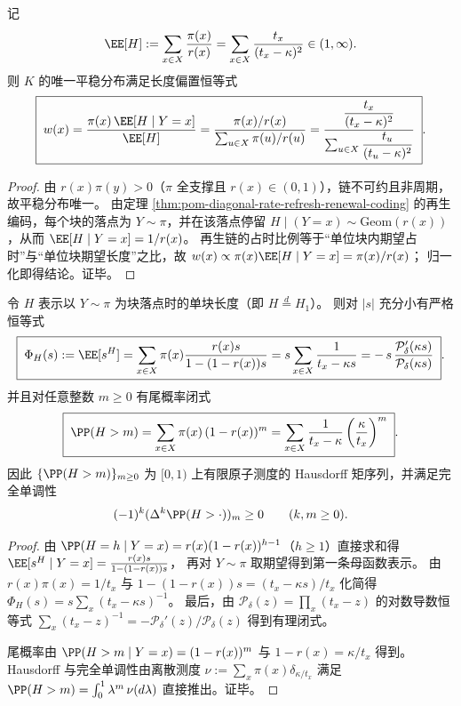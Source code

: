 \begin{corollary}\label{cor:pom-diagonal-rate-refresh-length-biased-stationary}
记
\[
\EE[H]:=\sum_{x\in X}\frac{\pi(x)}{r(x)}=\sum_{x\in X}\frac{t_x}{(t_x-\kappa)^2}\in(1,\infty).
\]
则 \(K\) 的唯一平稳分布满足长度偏置恒等式
\[
\boxed{\;
w(x)=\frac{\pi(x)\,\EE[H\mid Y=x]}{\EE[H]}
=\frac{\pi(x)/r(x)}{\sum_{u\in X}\pi(u)/r(u)}
=\frac{\dfrac{t_x}{(t_x-\kappa)^2}}{\sum_{u\in X}\dfrac{t_u}{(t_u-\kappa)^2}}\; } .
\]
\end{corollary}
\begin{proof}
由 \(r(x)\pi(y)>0\)（\(\pi\) 全支撑且 \(r(x)\in(0,1)\)），链不可约且非周期，故平稳分布唯一。
由定理 \ref{thm:pom-diagonal-rate-refresh-renewal-coding} 的再生编码，每个块的落点为 \(Y\sim\pi\)，并在该落点停留 \(H\mid(Y=x)\sim\mathrm{Geom}(r(x))\)，从而 \(\EE[H\mid Y=x]=1/r(x)\)。
再生链的占时比例等于“单位块内期望占时”与“单位块期望长度”之比，故
\(
w(x)\propto \pi(x)\EE[H\mid Y=x]=\pi(x)/r(x)
\)；
归一化即得结论。证毕。
\end{proof}

\begin{proposition}\label{prop:pom-diagonal-rate-refresh-holding-interval-pgf-hausdorff}
令 \(H\) 表示以 \(Y\sim\pi\) 为块落点时的单块长度（即 \(H\overset{d}{=}H_1\)）。
则对 \(|s|\) 充分小有严格恒等式
\[
\boxed{\;
\Phi_H(s):=\EE[s^H]
=\sum_{x\in X}\pi(x)\frac{r(x)s}{1-(1-r(x))s}
=s\sum_{x\in X}\frac{1}{t_x-\kappa s}
=-\,s\,\frac{\mathcal P_\delta'(\kappa s)}{\mathcal P_\delta(\kappa s)}\; } .
\]
并且对任意整数 \(m\ge 0\) 有尾概率闭式
\[
\boxed{\;
\PP(H>m)=\sum_{x\in X}\pi(x)\,(1-r(x))^{m}
=\sum_{x\in X}\frac{1}{t_x-\kappa}\left(\frac{\kappa}{t_x}\right)^{m}\; } .
\]
因此 \(\{\PP(H>m)\}_{m\ge 0}\) 为 \([0,1)\) 上有限原子测度的 Hausdorff 矩序列，并满足完全单调性
\[
(-1)^k(\Delta^k\PP(H>\cdot))_m\ge 0\qquad(k,m\ge 0).
\]
\end{proposition}
\begin{proof}
由 \(\PP(H=h\mid Y=x)=r(x)(1-r(x))^{h-1}\)（\(h\ge 1\)）直接求和得
\(
\EE[s^H\mid Y=x]=\frac{r(x)s}{1-(1-r(x))s}
\)，
再对 \(Y\sim\pi\) 取期望得到第一条母函数表示。
由 \(r(x)\pi(x)=1/t_x\) 与 \(1-(1-r(x))s=(t_x-\kappa s)/t_x\) 化简得
\(
\Phi_H(s)=s\sum_x (t_x-\kappa s)^{-1}
\)。
最后，由 \(\mathcal P_\delta(z)=\prod_x(t_x-z)\) 的对数导数恒等式
\(
\sum_x (t_x-z)^{-1}=-\mathcal P_\delta'(z)/\mathcal P_\delta(z)
\)
得到有理闭式。
\par
尾概率由 \(\PP(H>m\mid Y=x)=(1-r(x))^m\) 与 \(1-r(x)=\kappa/t_x\) 得到。
Hausdorff 与完全单调性由离散测度
\(
\nu:=\sum_x \pi(x)\delta_{\kappa/t_x}
\)
满足
\(
\PP(H>m)=\int_0^1 \lambda^m\,\nu(d\lambda)
\)
直接推出。证毕。
\end{proof}

